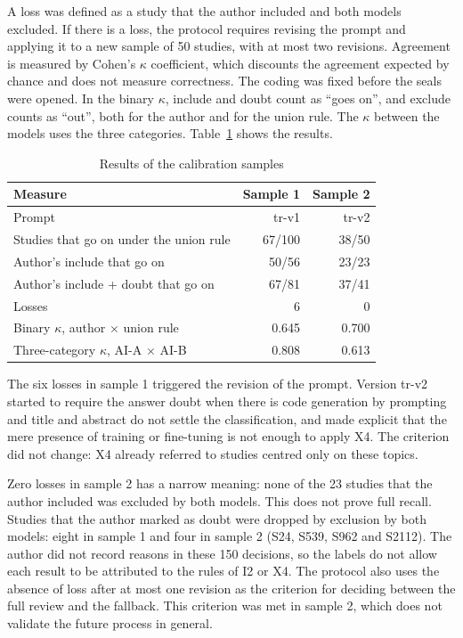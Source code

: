 A loss was defined as a study that the author included and both models excluded. If there is a loss, the
protocol requires revising the prompt and applying it to a new sample of 50 studies, with at most two revisions.
Agreement is measured by Cohen's $\kappa$ coefficient, which discounts the agreement expected by chance and
does not measure correctness. The coding was fixed before the seals were opened. In the binary $\kappa$, include and doubt count as
``goes on'', and exclude counts as ``out'', both for the author and for the union rule. The $\kappa$ between the
models uses the three categories. Table~\ref{tab:piloto} shows the results.

\begin{table}[!htb]
\caption{Results of the calibration samples}\label{tab:piloto}
\centering\footnotesize
\begin{tabular}{@{}lrr@{}}
\hline
Measure & Sample 1 & Sample 2\\
\hline
Prompt & tr-v1 & tr-v2\\
Studies that go on under the union rule & 67/100 & 38/50\\
Author's include that go on & 50/56 & 23/23\\
Author's include + doubt that go on & 67/81 & 37/41\\
Losses & 6 & 0\\
Binary $\kappa$, author $\times$ union rule & 0.645 & 0.700\\
Three-category $\kappa$, AI-A $\times$ AI-B & 0.808 & 0.613\\
\hline
\end{tabular}
\end{table}

The six losses in sample 1 triggered the revision of the prompt. Version tr-v2 started to require the answer
doubt when there is code generation by prompting and title and abstract do not settle the classification,
and made explicit that the mere presence of training or fine-tuning is not enough to apply X4. The criterion did not
change: X4 already referred to studies centred only on these topics.

Zero losses in sample 2 has a narrow meaning: none of the 23 studies that the author included was excluded
by both models. This does not prove full recall. Studies that the author marked as doubt were dropped by
exclusion by both models: eight in sample 1 and four in sample 2 (S24, S539, S962 and S2112). The author
did not record reasons in these 150 decisions, so the labels do not allow each result to be attributed
to the rules of I2 or X4. The protocol also uses the absence of loss after at most one revision as the
criterion for deciding between the full review and the fallback. This criterion was met in sample 2, which
does not validate the future process in general.

